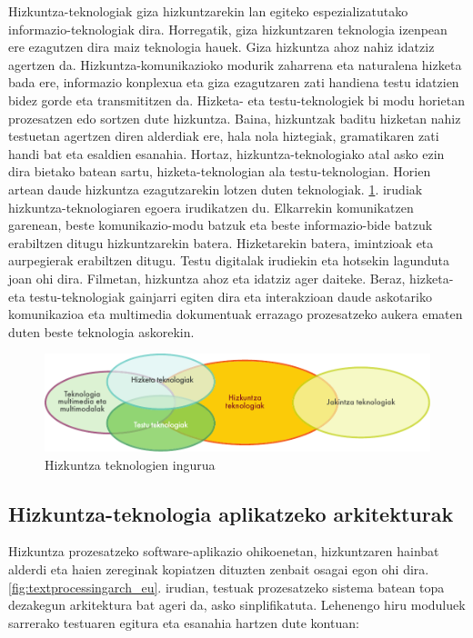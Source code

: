 \begin{multicols}{2}

  Hizkuntza-teknologiak giza hizkuntzarekin lan egiteko espezializatutako informazio-teknologiak dira. Horregatik, giza hizkuntzaren teknologia izenpean ere ezagutzen dira maiz teknologia hauek. Giza hizkuntza ahoz nahiz idatziz agertzen da. Hizkuntza-komunikazioko modurik zaharrena eta naturalena hizketa bada ere, informazio konplexua eta giza ezagutzaren zati handiena testu idatzien bidez gorde eta transmititzen da. Hizketa- eta testu-teknologiek bi modu horietan prozesatzen edo sortzen dute hizkuntza. Baina, hizkuntzak baditu hizketan nahiz testuetan agertzen diren alderdiak ere, hala nola hiztegiak, gramatikaren zati handi bat eta esaldien esanahia. Hortaz, hizkuntza-teknologiako atal asko ezin dira bietako batean sartu, hizketa-teknologian ala testu-teknologian. Horien artean daude hizkuntza ezagutzarekin lotzen duten teknologiak. \ref{fig:ltincontext_eu}. irudiak hizkuntza-teknologiaren egoera irudikatzen du. Elkarrekin komunikatzen garenean, beste komunikazio-modu batzuk eta beste informazio-bide batzuk erabiltzen ditugu hizkuntzarekin batera. Hizketarekin batera, imintzioak eta aurpegierak erabiltzen ditugu. Testu digitalak irudiekin eta hotsekin lagunduta joan ohi dira. Filmetan, hizkuntza ahoz eta idatziz ager daiteke. Beraz, hizketa- eta testu-teknologiak gainjarri egiten dira eta interakzioan daude askotariko komunikazioa eta multimedia dokumentuak errazago prozesatzeko aukera ematen duten beste teknologia askorekin. 
  
 
   \begin{figure}[htb]
  \vspace{-25mm}
  \center
  \includegraphics[width=\textwidth]{../_media/basque/language_technologies}
  \caption{Hizkuntza teknologien ingurua}
  \label{fig:ltincontext_eu}
\end{figure}

\subsection[Hizkuntza-teknologia aplikatzeko arkitekturak]{Hizkuntza-teknologia aplikatzeko arkitekturak}
    Hizkuntza prozesatzeko software-aplikazio ohikoenetan, hizkuntzaren hainbat alderdi eta haien zereginak kopiatzen dituzten zenbait osagai egon ohi dira. \ref{fig:textprocessingarch_eu}. irudian, testuak prozesatzeko sistema batean topa dezakegun arkitektura bat ageri da, asko sinplifikatuta. Lehenengo hiru moduluek sarrerako testuaren egitura eta esanahia hartzen dute kontuan:


\end{multicols}

